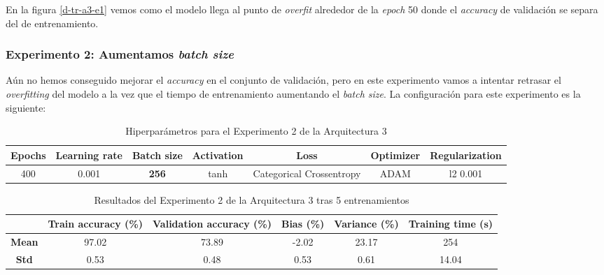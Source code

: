 \documentclass{article}
\begin{document}
			En la figura \ref{d-tr-a3-e1} vemos como el modelo llega al punto de \textit{overfit} alrededor de la \textit{epoch} 50 donde el \textit{accuracy} de validaci\'on se separa del de entrenamiento.
			
		\subsubsection{Experimento 2: Aumentamos \textit{batch size}}
		\label{d-s-a3-e2}
			A\'un no hemos conseguido mejorar el \textit{accuracy} en el conjunto de validaci\'on, pero en este experimento vamos a intentar retrasar el \textit{overfitting} del modelo a la vez que el tiempo de entrenamiento aumentando el \textit{batch size}. La configuraci\'on para este experimento es la siguiente:
			\begin{table}[!h]
				\begin{tabular}{| c | c | c | c | c | c | c |}
					\textbf{Epochs} & \textbf{Learning rate} & \textbf{Batch size} & \textbf{Activation} & \textbf{Loss} & \textbf{Optimizer} & \textbf{Regularization} \\ \hline
					400 & 0.001 & \textbf{256} & tanh & Categorical Crossentropy & ADAM & l2 0.001
				\end{tabular}
				\caption{Hiperpar\'ametros para el Experimento 2 de la Arquitectura 3}
				\label{tab:hip-d-a3-e2}
			\end{table}
			
			\begin{table}[!h]
				\begin{center}
					\begin{tabular}{ c | c | c | c | c | c |}
						\ & \textbf{Train accuracy (\%)} & \textbf{Validation accuracy (\%)} & \textbf{Bias (\%)} & \textbf{Variance (\%)} & \textbf{Training time (s)} \\ \hline
						\textbf{Mean} & 97.02 & 73.89 & -2.02 & 23.17 & 254 \\ \hline
						\textbf{Std} & 0.53 & 0.48 & 0.53 & 0.61 & 14.04 \\ \hline
					\end{tabular}
					\caption{Resultados del Experimento 2 de la Arquitectura 3 tras 5 entrenamientos}
					\label{tab:res-d-a3-e2}
				\end{center}
			\end{table}
				
\end{document}
